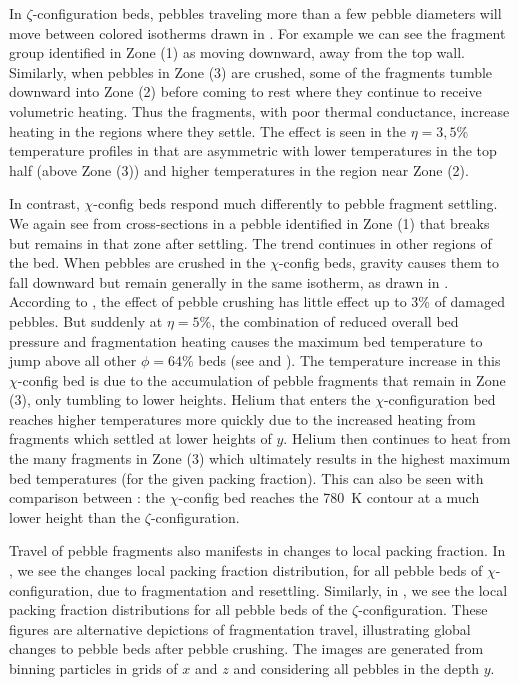 In $\zeta$-configuration beds, pebbles traveling more than a few pebble diameters will move between colored isotherms drawn in . For example we can see the fragment group identified in Zone (1) as moving downward, away from the top wall. Similarly, when pebbles in Zone (3) are crushed, some of the fragments tumble downward into Zone (2) before coming to rest where they continue to receive volumetric heating. Thus the fragments, with poor thermal conductance, increase heating in the regions where they settle. The effect is seen in the $\eta = 3, 5\%$ temperature profiles in  that are asymmetric with lower temperatures in the top half (above Zone (3)) and higher temperatures in the region near Zone (2).

In contrast, $\chi$-config beds respond much differently to pebble fragment settling. We again see from cross-sections in  a pebble identified in Zone (1) that breaks but remains in that zone after settling. The trend continues in other regions of the bed. When pebbles are crushed in the $\chi$-config beds, gravity causes them to fall downward but remain generally in the same isotherm, as drawn in . According to , the effect of pebble crushing has little effect up to 3\% of damaged pebbles. But suddenly at $\eta = 5\%$, the combination of reduced overall bed pressure and fragmentation heating causes the maximum bed temperature to jump above all other $\phi = 64\%$ beds (see  and ). The temperature increase in this $\chi$-config bed is due to the accumulation of pebble fragments that remain in Zone (3), only tumbling to lower heights. Helium that enters the $\chi$-configuration bed reaches higher temperatures more quickly due to the increased heating from fragments which settled at lower heights of $y$. Helium then continues to heat from the many fragments in Zone (3) which ultimately results in the highest maximum bed temperatures (for the given packing fraction). This can also be seen with comparison between : the $\chi$-config bed reaches the \SI{780}{\kelvin} contour at a much lower height than the $\zeta$-configuration. 

Travel of pebble fragments also manifests in changes to local packing fraction. In , we see the changes local packing fraction distribution, for all pebble beds of $\chi$-configuration, due to fragmentation and resettling. Similarly, in , we see the local packing fraction distributions for all pebble beds of the $\zeta$-configuration. These figures are alternative depictions of fragmentation travel, illustrating global changes to pebble beds after pebble crushing. The images are generated from binning particles in grids of $x$ and $z$ and considering all pebbles in the depth $y$.

